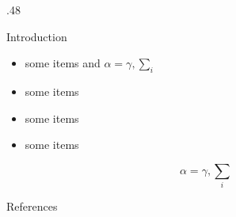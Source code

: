 \documentclass{beamer}
\begin{document}
\begin{frame}{}
\begin{columns}[t]
\begin{column}{.48\linewidth}
        \begin{block}{Introduction}
          \begin{itemize}
          \item some items and $\alpha=\gamma, \sum_{i}$
          \item some items
          \item some items
          \item some items
          \end{itemize}
          $$\alpha=\gamma, \sum_{i}$$
        \end{block}
        
        \begin{block}{References}
        {\tiny
        \printbibliography
        }
      \end{block} 
      \end{column}
    \end{columns}
  \end{frame}
\end{document}
